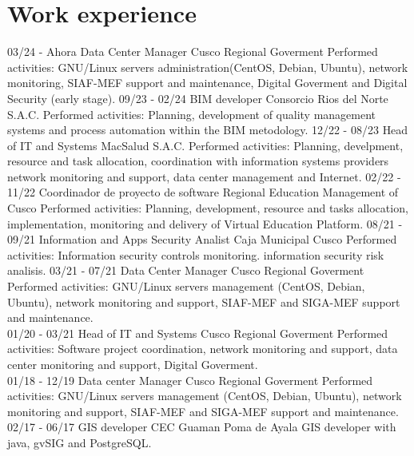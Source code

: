 \documentclass[]{friggeri-cv}
\begin{document}
\section{Work experience}
\begin{entrylist}
    \entry
    {03/24 - Ahora}
    {Data Center Manager}
    {Cusco Regional Goverment}
	{Performed activities: GNU/Linux servers administration(CentOS, Debian, Ubuntu), network monitoring,
	SIAF-MEF support and maintenance, Digital Goverment and Digital Security (early stage).}
    \entry
    {09/23 - 02/24}
    {BIM developer}
    {Consorcio Rios del Norte S.A.C.}
    {Performed activities: Planning, development of quality management systems and process automation within the BIM metodology.}
    \entry
    {12/22 - 08/23}
    {Head of IT and Systems}
    {MacSalud S.A.C.}
    {Performed activities: Planning, develpment, resource and task allocation, coordination with information systems providers
     network monitoring and support, data center management and Internet.}
    \entry
    {02/22 - 11/22}
    {Coordinador de proyecto de software}
    {Regional Education Management of Cusco}
    {Performed activities: Planning, development, resource and tasks allocation,
     implementation, monitoring and delivery of Virtual Education Platform.}
    \entry
    {08/21 - 09/21}
    {Information and Apps Security Analist}
    {Caja Municipal Cusco}
    {Performed activities: Information security controls monitoring. information security risk analisis.}
    \entry
    {03/21 - 07/21}
    {Data Center Manager}
    {Cusco Regional Goverment}
	{Performed activities: GNU/Linux servers management (CentOS, Debian, Ubuntu), network monitoring and support, SIAF-MEF 
	and SIGA-MEF support and maintenance.\\}
    \entry
    {01/20 - 03/21}
    {Head of IT and Systems}
    {Cusco Regional Goverment}
    {Performed activities: Software project coordination, network monitoring and support, data center monitoring and support,
	Digital Goverment.\\}
    \entry
    {01/18 - 12/19}
    {Data center Manager}
    {Cusco Regional Goverment}
    {Performed activities: GNU/Linux servers management (CentOS, Debian, Ubuntu), network monitoring and support, SIAF-MEF 
	and SIGA-MEF support and maintenance.\\}
    \entry
    {02/17 - 06/17}
    {GIS developer}
    {CEC Guaman Poma de Ayala}
    {GIS developer with java, gvSIG and PostgreSQL.\\}
\end{entrylist}
\end{document}
